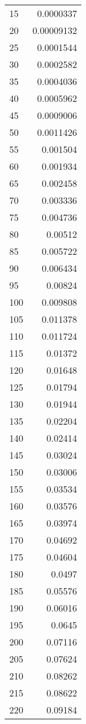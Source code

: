 
    \begin{supertabular}{ l | *{1}{d{10}}}
15 & 0.0000337 \\
20 & 0.00009132 \\
25 & 0.0001544 \\
30 & 0.0002582 \\
35 & 0.0004036 \\
40 & 0.0005962 \\
45 & 0.0009006 \\
50 & 0.0011426 \\
55 & 0.001504 \\
60 & 0.001934 \\
65 & 0.002458 \\
70 & 0.003336 \\
75 & 0.004736 \\
80 & 0.00512 \\
85 & 0.005722 \\
90 & 0.006434 \\
95 & 0.00824 \\
100 & 0.009808 \\
105 & 0.011378 \\
110 & 0.011724 \\
115 & 0.01372 \\
120 & 0.01648 \\
125 & 0.01794 \\
130 & 0.01944 \\
135 & 0.02204 \\
140 & 0.02414 \\
145 & 0.03024 \\
150 & 0.03006 \\
155 & 0.03534 \\
160 & 0.03576 \\
165 & 0.03974 \\
170 & 0.04692 \\
175 & 0.04604 \\
180 & 0.0497 \\
185 & 0.05576 \\
190 & 0.06016 \\
195 & 0.0645 \\
200 & 0.07116 \\
205 & 0.07624 \\
210 & 0.08262 \\
215 & 0.08622 \\
220 & 0.09184 \\

\end{supertabular}
